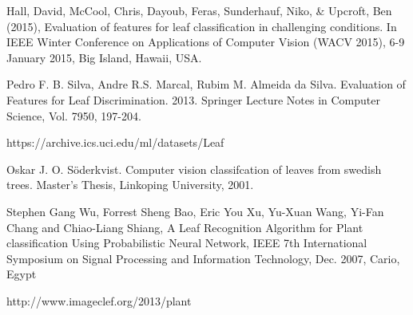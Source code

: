 \documentclass[journal]{IEEEtran}
\begin{document}
\begin{thebibliography}{1}
  Hall, David, McCool, Chris, Dayoub, Feras, Sunderhauf, Niko, & Upcroft, Ben (2015), Evaluation of features for leaf classification in challenging conditions. In IEEE Winter Conference on Applications of Computer Vision (WACV 2015), 6-9 January 2015, Big Island, Hawaii, USA.



  Pedro F. B. Silva, Andre R.S. Marcal, Rubim M. Almeida da Silva. Evaluation of Features for Leaf Discrimination. 2013. Springer Lecture Notes in Computer Science, Vol. 7950, 197-204.

  https://archive.ics.uci.edu/ml/datasets/Leaf

  Oskar J. O. Söderkvist. Computer vision classifcation of leaves from swedish trees. Master's Thesis, Linkoping University, 2001.

  Stephen Gang Wu, Forrest Sheng Bao, Eric You Xu, Yu-Xuan Wang, Yi-Fan Chang and Chiao-Liang Shiang, A Leaf Recognition Algorithm for Plant classification Using Probabilistic Neural Network, IEEE 7th International Symposium on Signal Processing and Information Technology, Dec. 2007, Cario, Egypt

  http://www.imageclef.org/2013/plant
\end{thebibliography}

%






\end{document}
